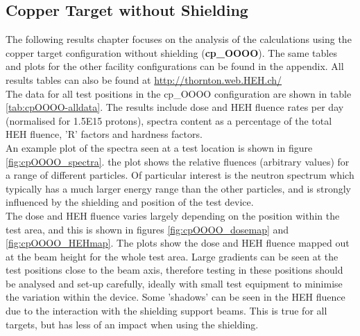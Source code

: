 \clearpage

\subsection{Copper Target without Shielding}

The following results chapter focuses on the analysis of the calculations using the copper target configuration without shielding (\textbf{cp\_OOOO}). The same tables and plots for the other facility configurations can be found in the appendix. All results tables can also be found at \url{http://thornton.web.HEH.ch/}  \\

The data for all test positions in the cp\_OOOO configuration are shown in table \ref{tab:cpOOOO-alldata}. The results include dose and HEH fluence rates per day (normalised for 1.5E15 protons), spectra content as a percentage of the total HEH fluence, 'R' factors and hardness factors. \\

An example plot of the spectra seen at a test location is shown in figure \ref{fig:cpOOOO_spectra}. the plot shows the relative fluences (arbitrary values) for a range of different particles. Of particular interest is the neutron spectrum which typically has a much larger energy range than the other particles, and is strongly influenced by the shielding and position of the test device. \\

The dose and HEH fluence varies largely depending on the position within the test area, and this is shown in figures \ref{fig:cpOOOO_dosemap} and \ref{fig:cpOOOO_HEHmap}. The plots show the dose and HEH fluence mapped out at the beam height for the whole test area. Large gradients can be seen at the test positions close to the beam axis, therefore testing in these positions should be analysed and set-up carefully, ideally with small test equipment to minimise the variation within the device. Some 'shadows' can be seen in the HEH fluence due to the interaction with the shielding support beams. This is true for all targets, but has less of an impact when using the shielding. \\

